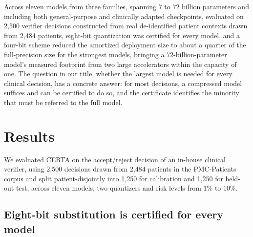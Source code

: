 \documentclass[pdflatex,sn-mathphys-num]{sn-jnl}%
\theoremstyle{thmstyleone}%
\theoremstyle{thmstyletwo}%
\theoremstyle{thmstylethree}%
\begin{document}
Across eleven models from three families, spanning 7 to 72 billion parameters and including both
general-purpose and clinically adapted checkpoints, evaluated on 2{,}500 verifier decisions constructed from real de-identified patient contexts
drawn from 2{,}484 patients, eight-bit quantization was certified for every model, and a four-bit
scheme reduced the amortized deployment size to about a quarter of the full-precision size for the strongest
models, bringing a 72-billion-parameter model's measured footprint from two large accelerators within the capacity of one. The question in our
title, whether the largest model is needed for every clinical decision, has a concrete answer: for
most decisions, a compressed model suffices and can be certified to do so, and the certificate
identifies the minority that must be referred to the full model.



\section*{Results}
 
We evaluated CERTA on the accept/reject decision of an in-house clinical verifier, using 2{,}500
decisions drawn from 2{,}484 patients in the PMC-Patients corpus and split patient-disjointly into 1{,}250 for calibration and
1{,}250 for held-out test, across eleven models, two quantizers and risk levels from $1\%$ to
$10\%$.
 
\subsection*{Eight-bit substitution is certified for every model}
 
\end{document}
